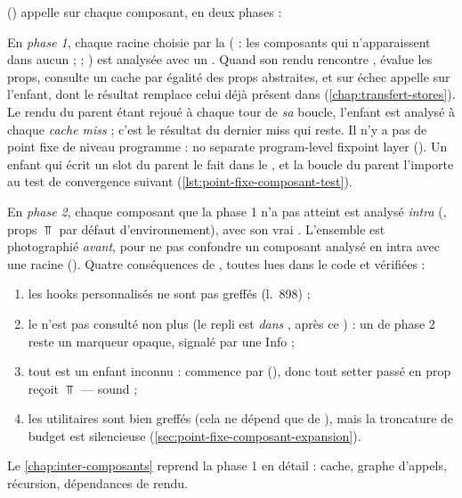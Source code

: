  () appelle
 sur chaque composant, en deux phases :


En \emph{phase 1}, chaque racine choisie par la 
( : les composants qui n'apparaissent dans aucun
 ;  ; ) est analysée avec un
. Quand son rendu rencontre ,
 évalue les props, consulte un cache par égalité des
props abstraites, et sur échec appelle  sur
l'enfant, dont le résultat remplace celui déjà présent dans 
(\cref{chap:transfert-stores}). Le rendu du parent étant rejoué à chaque
tour de \emph{sa} boucle, l'enfant est analysé à chaque \emph{cache miss} ;
c'est le résultat du dernier miss qui reste. Il n'y a pas de point fixe de
niveau programme : \og no separate program-level fixpoint layer\fg{}
(). Un enfant qui écrit un slot du parent le fait dans le
, et la boucle du parent l'importe au test de
convergence suivant (\cref{lst:point-fixe-composant-test}).

En \emph{phase 2}, chaque composant que la phase 1 n'a pas atteint est
analysé \emph{intra} (, props $\Top$ par défaut
d'environnement), avec son vrai . L'ensemble
 est photographié \emph{avant}, pour ne pas confondre
un composant analysé en intra avec une racine (). Quatre
conséquences de , toutes lues dans le code et vérifiées :
\begin{enumerate}
  \item les hooks personnalisés ne sont pas greffés (l.~898) ;
  \item le  n'est pas consulté non plus (le repli est
    \emph{dans} , après ce ) : un
     de phase 2 reste un marqueur opaque, signalé par une
    Info  ;
  \item tout  est un enfant inconnu : 
    commence par 
    (), donc tout setter
    passé en prop reçoit $\Top$ --- sound ;
  \item les utilitaires sont bien greffés (cela ne dépend que de
    ), mais la troncature de budget est
    silencieuse (\cref{sec:point-fixe-composant-expansion}).
\end{enumerate}
Le \cref{chap:inter-composants} reprend la phase 1 en détail : cache, graphe
d'appels, récursion, dépendances de rendu.

